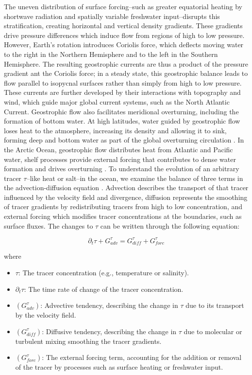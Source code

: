 \documentclass[draft]{agujournal2019}
\begin{document}
The uneven distribution of surface forcing--such as greater equatorial heating by shortwave radiation and spatially variable freshwater input--disrupts this stratification, creating horizontal and vertical density gradients. These gradients drive pressure differences which induce flow from regions of high to low pressure. However, Earth's rotation introduces Coriolis force, which deflects moving water to the right in the Northern Hemisphere and to the left in the Southern Hemisphere. The resulting geostrophic currents are thus a product of the pressure gradient ant the Coriolis force; in a steady state, this geostrophic balance leads to flow parallel to isopycnal surfaces rather than simply from high to low pressure. These currents are further developed by their interactions with topography and wind, which guide major global current systems, such as the North Atlantic Current. Geostrophic flow also facilitates meridional overturning, including the formation of bottom water. At high latitudes, water guided by geostrophic flow loses heat to the atmosphere, increasing its density and allowing it to sink, forming deep and bottom water as part of the global overturning circulation \cite{Vallis2006}. In the Arctic Ocean, geostrophic flow distributes heat from Atlantic and Pacific water, shelf processes provide external forcing that contributes to dense water formation and drives overturning \cite{Rudels2008}. To understand the evolution of an arbitrary tracer $\tau$--like heat or salt--in the ocean, we examine the balance of three terms in the advection-diffusion equation \cite{Campin2004}. Advection describes the transport of that tracer influenced by the velocity field and divergence, diffusion represents the smoothing of tracer gradients by redistributing tracers from high to low concentration, and external forcing which modifies tracer concentrations at the boundaries, such as surface fluxes. The changes to $\tau$ can be written through the following equation:

$$
\partial_t\tau + G^\tau_{adv} = G^\tau_{diff} + G^\tau_{forc}
$$

where
\begin{itemize}
    \item \(\tau\): The tracer concentration (e.g., temperature or salinity).
    \item \(\partial_t \tau\): The time rate of change of the tracer concentration.
    \item $(G^{\tau}_{adv})$: Advective tendency, describing the change in $\tau$ due to its transport by the velocity field.
    \item $(G^{\tau}_{diff})$: Diffusive tendency, describing the change in $\tau$ due to molecular or turbulent mixing smoothing the tracer gradients.
    \item $(G^{\tau}_{forc})$: The external forcing term, accounting for the addition or removal of the tracer by processes such as surface heating or freshwater input.
\end{itemize}
\end{document}
